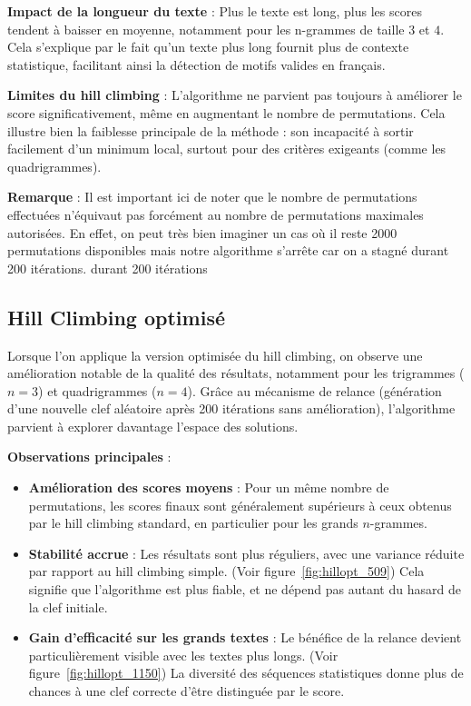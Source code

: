 \documentclass[a4paper]{article}
\begin{document}
\textbf{Impact de la longueur du texte} : Plus le texte est long, plus les scores tendent à baisser en moyenne, notamment pour les n-grammes de taille $3$ et $4$. Cela s'explique par le fait qu’un texte plus long fournit plus de contexte statistique, facilitant ainsi la détection de motifs valides en français.

\textbf{Limites du hill climbing} : L’algorithme ne parvient pas toujours à améliorer le score significativement, même en augmentant le nombre de permutations. Cela illustre bien la faiblesse principale de la méthode : son incapacité à sortir facilement d’un minimum local, surtout pour des critères exigeants (comme les quadrigrammes).

\textbf{Remarque} : Il est important ici de noter que le nombre de permutations effectuées n'équivaut pas forcément au nombre de permutations maximales autorisées. En effet, on peut très bien imaginer un cas où il reste 2000 permutations disponibles mais notre algorithme s'arrête car on a stagné durant 200 itérations.
durant 200 itérations


\subsection{Hill Climbing optimisé}

Lorsque l’on applique la version optimisée du hill climbing, on observe une amélioration notable de la qualité des résultats, notamment pour les trigrammes ($n=3$) et quadrigrammes ($n=4$). Grâce au mécanisme de relance (génération d’une nouvelle clef aléatoire après 200 itérations sans amélioration), l’algorithme parvient à explorer davantage l’espace des solutions.

\textbf{Observations principales} :
\begin{itemize}
    \item \textbf{Amélioration des scores moyens} : Pour un même nombre de permutations, les scores finaux sont généralement supérieurs à ceux obtenus par le hill climbing standard, en particulier pour les grands $n$-grammes.
    
    \item \textbf{Stabilité accrue} : Les résultats sont plus réguliers, avec une variance réduite par rapport au hill climbing simple. (Voir figure~\ref{fig:hillopt_509}) Cela signifie que l’algorithme est plus fiable, et ne dépend pas autant du hasard de la clef initiale.
    
    \item \textbf{Gain d’efficacité sur les grands textes} : Le bénéfice de la relance devient particulièrement visible avec les textes plus longs. (Voir figure~\ref{fig:hillopt_1150}) La diversité des séquences statistiques donne plus de chances à une clef correcte d’être distinguée par le score.
\end{itemize}
\end{document}
